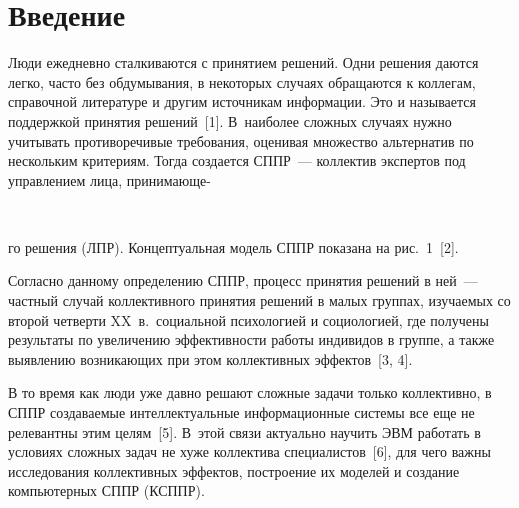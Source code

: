       \begin{multicols}{2}

            \label{st\stat}
  
  
\section{Введение}

  Люди ежедневно сталкиваются с принятием решений. Одни решения даются 
легко, часто без обдумывания, в некоторых случаях обращаются к коллегам, 
справочной литературе и другим источникам информации. Это и называется 
поддержкой принятия решений~[1]. В~наиболее сложных случаях нужно 
учитывать противоречивые требования, оценивая множество альтернатив по 
нескольким критериям. Тогда создается СППР~--- 
коллектив экспертов под управлением лица, принимающе-\linebreak

\begin{center}  %
 \mbox{%
 \epsfxsize=77.058mm
 }
 \end{center}
 \vspace*{6pt}
 




\addtocounter{figure}{1}


 

\noindent
го 
решения (ЛПР). Концептуальная модель СППР показана на рис.~1~[2]. 
  
  Согласно данному определению СППР, процесс принятия решений в ней~--- 
частный случай коллективного принятия решений в малых группах, изучаемых 
со второй четверти XX~в.\ социальной психологией и социологией, где 
получены результаты по увеличению эффективности работы индивидов в 
группе, а также выявлению возникающих при этом коллективных 
  эффектов~[3, 4]. 
  

  
  В то время как люди уже давно решают сложные задачи только коллективно, 
в СППР создаваемые интеллектуальные информационные системы все еще не 
релевантны этим целям~[5]. В~этой связи актуально научить ЭВМ работать в 
условиях сложных задач не хуже коллектива специалистов~[6], для чего важны 
исследования коллективных эффектов, построение их моделей и создание 
компьютерных СППР (КСППР). 


\end{multicols}
